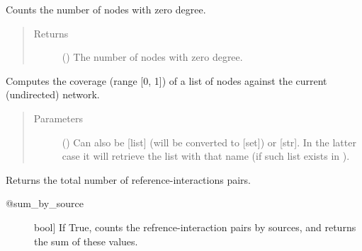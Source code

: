 \documentclass[letterpaper,10pt,english]{sphinxmanual}
\begin{document}
\begin{fulllineitems}

\begin{fulllineitems}
\label{\detokenize{main:pypath.main.PyPath.count_sol}}
Counts the number of nodes with zero degree.
\begin{quote}\begin{description}
\item[{Returns}] \leavevmode
() \textendash{} The number of nodes with zero degree.

\end{description}\end{quote}

\end{fulllineitems}


\begin{fulllineitems}
\label{\detokenize{main:pypath.main.PyPath.coverage}}
Computes the coverage (range {[}0, 1{]}) of a list of nodes against
the current (undirected) network.
\begin{quote}\begin{description}
\item[{Parameters}] \leavevmode
{} () \textendash{} Can also be {[}list{]} (will be converted to {[}set{]}) or {[}str{]}. In
the latter case it will retrieve the list with that name (if
such list exists in ).

\end{description}\end{quote}

\end{fulllineitems}


\begin{fulllineitems}
\label{\detokenize{main:pypath.main.PyPath.curation_effort}}
Returns the total number of reference-interactions pairs.
\begin{description}
\item[{@sum\_by\_source}] \leavevmode{[}bool{]}
If True, counts the refrence-interaction pairs by
sources, and returns the sum of these values.


\end{description}
\end{fulllineitems}
\end{fulllineitems}
\end{document}
